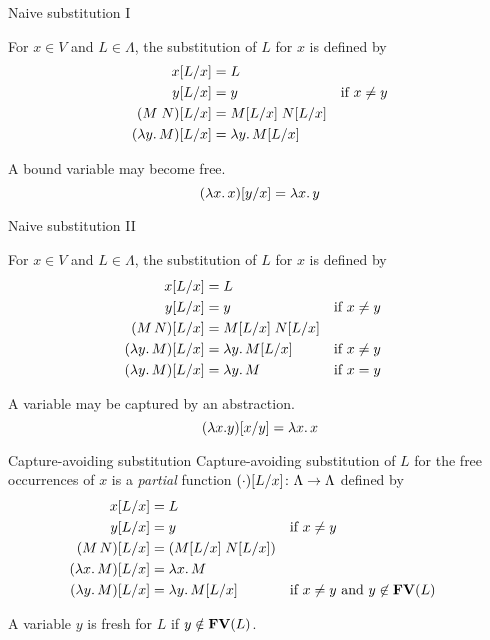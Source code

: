 \begin{frame}{Naive substitution I}
  \begin{definition}
    For $x \in V$ and $L \in \Lambda$, the substitution of $L$ for $x$ is
    defined by
    \begin{align*}
      x[{L}/{x}] & = L \\
      y[{L}/{x}] & = y & \text{if $x \neq y$} \\
      (M\;N)[{L}/{x}]& = M[{L}/{x}] \; N[{L}/{x}] \\
      (\lambda y.\, M)[{L}/{x}] & = \lambda y.\, M [{L}/{x}]
    \end{align*}
  \end{definition}
    A bound variable may become free. 
    \[
      (\lambda x.\, x)[{y}/{x}] = \lambda x.\, y
    \]
\end{frame}
\begin{frame}{Naive substitution II}
  \begin{definition}
    For $x \in V$ and $L \in \Lambda$, the substitution
    of $L$ for $x$ is defined by
    \begin{align*}
      x[{L}/{x}] & = L \\
      y[{L}/{x}] & = y && \text{if $x \neq y$} \\
      (M\,N)[{L}/{x}] & = M[{L}/{x}]\; N[{L}/{x}] \\
      (\lambda y.\, M)[{L}/{x}] & = \lambda y.\, M[{L}/{x}] && \text{if $x \neq y$} \\
      (\lambda y.\, M)[{L}/{x}] & = \lambda y.\, M && \text{if $x = y$} 
    \end{align*}
  \end{definition}
    A variable may be captured by an abstraction. 
    \[
      (\lambda x. y)[{x}/{y}] = \lambda x.\, x
    \]
\end{frame}


\begin{frame}{Capture-avoiding substitution}
  Capture-avoiding substitution of $L$ for the \alert{free occurrences} of $x$ is a
  \emph{partial} function $(\cdot)[{L}/{x}]\colon \Lambda \to \Lambda$ defined by
  \begin{align*}
    x[{L}/{x}] & = L \\
    y[{L}/{x}] & = y && \text{if $x \neq y$} \\
    (M\, N)[{L}/{x}] & = (M[{L}/{x}]\; N[{L}/{x}]) \\
    (\lambda x.\, M)[{L}/{x}] & = \lambda x.\, M \\
    (\lambda y.\, M)[{L}/{x}] & = \lambda y.\, M[{L}/{x}]                                 &&\text{if $x \neq y$ and $y \not\in \mathbf{FV}(L)$}
  \end{align*}
  \begin{definition}[Freshness]
    A variable $y$ is \alert{fresh} for $L$ if $y \notin \mathbf{FV}(L)$.  
  \end{definition}
\end{frame}

